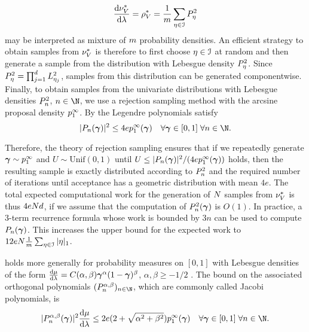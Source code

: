 \begin{equation*}
\frac{\text{d}\nu^{*}_{V}}{\text{d}\lambda}=\rho^{*}_{V}=\frac{1}{m}\sum_{\eta\in\mathcal{I}}P_{\eta}^2
\end{equation*} may be interpreted as mixture of $m$ probability densities. An efficient strategy to obtain samples from $\nu^{*}_{V}$ is therefore to first choose $\eta\in\mathcal{I}$ at random and then generate a sample from the distribution with Lebesgue density $P^2_{\eta}$. Since $P^2_{\eta}=\prod_{j=1}^{d}L^2_{\eta_j}$, samples from this distribution can be generated componentwise. Finally, to obtain samples from the univariate distributions with Lebesgue densities $P^2_{n}$, $n\in\N$, we use a rejection sampling method with the arcsine proposal density $p^{\infty}_{1}$. By \cite[Theorem 1]{nevai1994generalized} the Legendre polynomials satisfy
 \begin{equation}
 \label{eq:rejectionbound}
|\leg_{n}(\psmi)|^2\leq 4e\arcsine_{1}(\psmi)\quad\forall \psmi\in[0,1]\;\forall n\in\N.
 \end{equation}

 Therefore, the theory of rejection sampling \cite[Chapter 4.5]{MR2151519} ensures that if we repeatedly generate $\bm{\gamma}\sim p^{\infty}_{1}$ and $U\sim\text{Unif}(0,1)$ until $U\leq |P_{n}(\bm{\gamma})|^2/(4ep^{\infty}_{1}(\bm{\gamma}))$ holds, then the resulting sample is exactly distributed according to $P_n^2$ and the required number of iterations until acceptance has a geometric distribution with mean $4e$.
The total expected computational work for the generation of $N$ samples from $\nu^{*}_{V}$ is thus $4eN d$, if we assume that the computation of $P^2_n(\bm{\gamma})$ is $O(1)$. In practice, a 3-term recurrence formula whose work is bounded by $3n$ can be used to compute $P_{n}(\bm{\gamma})$. This increases  the upper bound for the expected  work to $12eN \frac{1}{m}\sum_{\eta\in\mathcal{I}}|\eta|_{1}$.%


 holds more generally for probability measures on $[0,1]$ with Lebesgue densities of the form $\frac{\text{d}\mu}{\text{d}\lambda}=C(\alpha,\beta)\bm{\gamma}^{\alpha}(1-\bm{\gamma})^{\beta}$, $\alpha,\beta\geq -1/2$  \cite[Theorem 1]{nevai1994generalized}. The bound on the associated orthogonal polynomials $(\leg^{\alpha,\beta}_{n})_{n\in\N}$, which are commonly called Jacobi polynomials, is
\begin{equation*}
|\leg^{\alpha,\beta}_n(\psmi)|^2\frac{\text{d}\measure}{\text{d}\lambda}\leq 2e(2+\sqrt{\alpha^2+\beta^2})\arcsine_{1}(\psmi)\quad\forall\psmi\in[0,1]\;\forall n\in\N.
\end{equation*}


